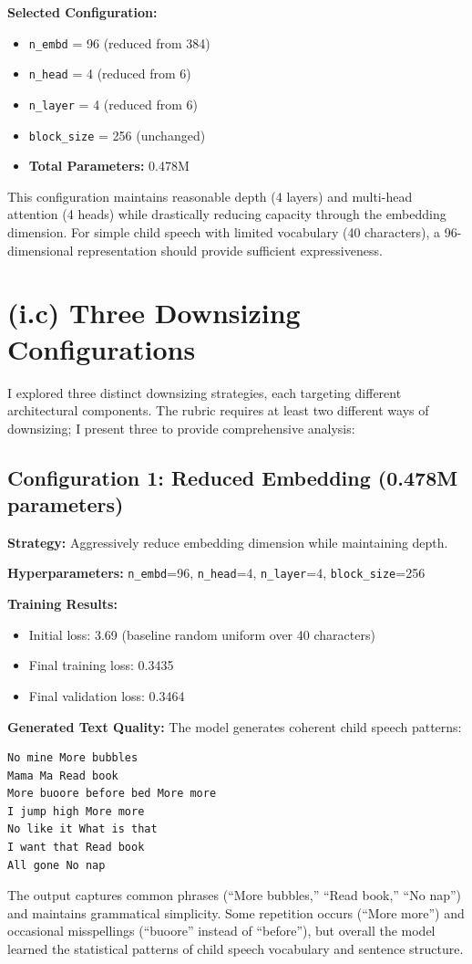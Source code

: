 \documentclass[11pt]{article}
\begin{document}
\textbf{Selected Configuration:} 
\begin{itemize}
    \item \texttt{n\_embd} = 96 (reduced from 384)
    \item \texttt{n\_head} = 4 (reduced from 6)
    \item \texttt{n\_layer} = 4 (reduced from 6)
    \item \texttt{block\_size} = 256 (unchanged)
    \item \textbf{Total Parameters:} 0.478M
\end{itemize}

This configuration maintains reasonable depth (4 layers) and multi-head attention (4 heads) while drastically reducing capacity through the embedding dimension. For simple child speech with limited vocabulary (40 characters), a 96-dimensional representation should provide sufficient expressiveness.

\section*{(i.c) Three Downsizing Configurations}

I explored three distinct downsizing strategies, each targeting different architectural components. The rubric requires at least two different ways of downsizing; I present three to provide comprehensive analysis:

\subsection*{Configuration 1: Reduced Embedding (0.478M parameters)}

\textbf{Strategy:} Aggressively reduce embedding dimension while maintaining depth.

\textbf{Hyperparameters:} \texttt{n\_embd}=96, \texttt{n\_head}=4, \texttt{n\_layer}=4, \texttt{block\_size}=256

\textbf{Training Results:}
\begin{itemize}
    \item Initial loss: 3.69 (baseline random uniform over 40 characters)
    \item Final training loss: 0.3435
    \item Final validation loss: 0.3464
\end{itemize}

\textbf{Generated Text Quality:} The model generates coherent child speech patterns:
\begin{verbatim}
No mine More bubbles
Mama Ma Read book
More buoore before bed More more
I jump high More more
No like it What is that
I want that Read book
All gone No nap
\end{verbatim}
The output captures common phrases (``More bubbles,'' ``Read book,'' ``No nap'') and maintains grammatical simplicity. Some repetition occurs (``More more'') and occasional misspellings (``buoore'' instead of ``before''), but overall the model learned the statistical patterns of child speech vocabulary and sentence structure.
\end{document}
